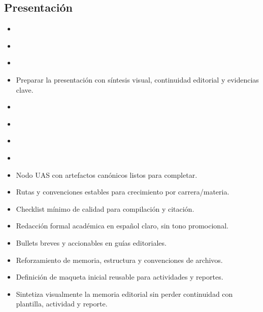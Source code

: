 \documentclass[12pt]{article}
\begin{document}
\subsection*{Presentación}
\begin{itemize}[leftmargin=*]
  \item \\%
  \item \\%
  \item \\%
  \item Preparar la presentación con síntesis visual, continuidad editorial y evidencias clave.
  \item \\%
  \item \\%
  \item \\%
  \item \\%
  \item Nodo UAS con artefactos canónicos listos para completar.
  \item Rutas y convenciones estables para crecimiento por carrera/materia.
  \item Checklist mínimo de calidad para compilación y citación.
  \item Redacción formal académica en español claro, sin tono promocional.
  \item Bullets breves y accionables en guías editoriales.
  \item Reforzamiento de memoria, estructura y convenciones de archivos.
  \item Definición de maqueta inicial reusable para actividades y reportes.
  \item Sintetiza visualmente la memoria editorial sin perder continuidad con plantilla, actividad y reporte.
\end{itemize}
\end{document}
